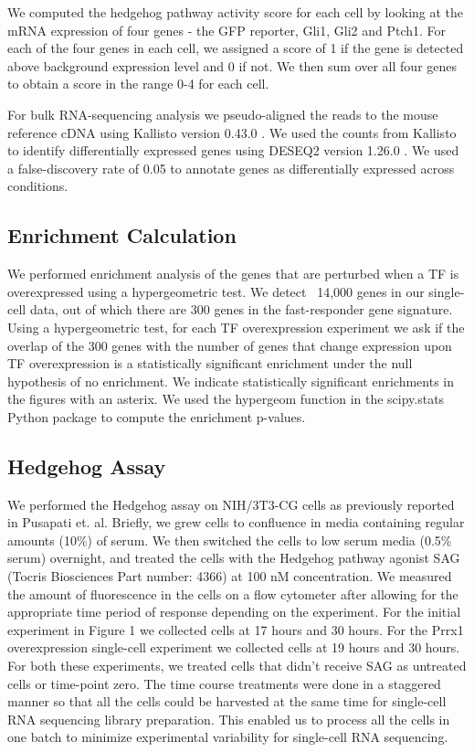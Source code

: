 We computed the hedgehog pathway activity score for each cell by looking at the mRNA expression of four genes - the GFP reporter,  Gli1, Gli2 and Ptch1. For each of the four genes in each cell, we assigned a score of 1 if the gene is detected above background expression level and 0 if not. We then sum over all four genes to obtain a score in the range 0-4 for each cell.

For bulk RNA-sequencing analysis we pseudo-aligned the reads to the mouse reference cDNA using Kallisto version 0.43.0 \cite{Bray2016-hc}. We used the counts from Kallisto to identify differentially expressed genes using DESEQ2 version 1.26.0 \cite{Love2014-lk}. We used a false-discovery rate of 0.05 to annotate genes as differentially expressed across conditions.

\subsection{Enrichment Calculation}
We performed enrichment analysis of the genes that are perturbed when a TF is overexpressed using a hypergeometric test. We detect ~14,000 genes in our single-cell data, out of which there are 300 genes in the fast-responder gene signature. Using a hypergeometric test, for each TF overexpression experiment we ask if the overlap of the 300 genes with the number of genes that change expression upon TF overexpression is a statistically significant enrichment under the null hypothesis of no enrichment. We indicate statistically significant enrichments in the figures with an asterix. We used the hypergeom function in the scipy.stats Python package to compute the enrichment p-values.

\subsection{Hedgehog Assay}
We performed the Hedgehog assay on NIH/3T3-CG cells as previously reported in Pusapati et. al. Briefly, we grew cells to confluence in media containing regular amounts (10\%) of serum. We then switched the cells to low serum media (0.5\% serum) overnight, and treated the cells with the Hedgehog pathway agonist SAG (Tocris Biosciences Part number: 4366) at 100 nM concentration. We measured the amount of fluorescence in the cells on a flow cytometer after allowing for the appropriate time period of response depending on the experiment. For the initial experiment in Figure 1 we collected cells at 17 hours and 30 hours. For the Prrx1 overexpression single-cell experiment we collected cells at 19 hours and 30 hours. For both these experiments, we treated cells that didn’t receive SAG as untreated cells or time-point zero. The time course treatments were done in a staggered manner so that all the cells could be harvested at the same time for single-cell RNA sequencing library preparation. This enabled us to process all the cells in one batch to minimize experimental variability for single-cell RNA sequencing. 

